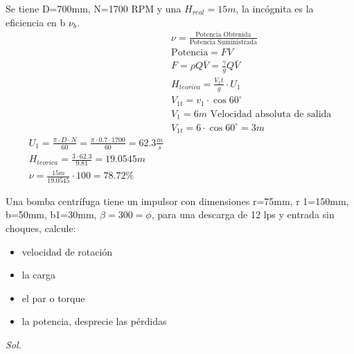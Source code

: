 Se tiene D=700mm, N=1700 RPM y una $H_{real}=15m$, la incógnita es la eficiencia en b $\nu_b$.
\begin{align*}
    &\nu = \frac{\text{Potencia Obtenida}}{\text{Potencia Suministrada}}\\
    &\text{Potencia}=FV\\
    &F =\rho Q\bar{V} = \frac{\gamma}{g}Q\bar{V}\\
    &H_{teorica} = \frac{V_1t}{g}  \cdot U_1\\
    &V_{1t} = v_1 \cdot \cos{60^{\circ}}\\
    &V_1 = 6m\text{ Velocidad absoluta de salida}\\
    &V_{1t} = 6 \cdot \cos{60^{\circ}} = 3m\\
    U_1 = \frac{\pi \cdot D \cdot N}{60} = \frac{\pi \cdot 0.7 \cdot  1700 }{60} = 62.3 \frac{m}{s}\\
    H_{teorica} = \frac{3 \cdot 62.3}{9.81} = 19.0545m\\
    \nu = \frac{15m}{19.0545} \cdot 100 = 78.72 \%\quad
\end{align*} 
\begin{example}
    Una bomba centrífuga tiene un impulsor con dimensiones r=75mm, r 1=150mm, b=50mm, b1=30mm, $\beta=300=\phi$, para una descarga de 12 lps y entrada sin choques, calcule:
    \begin{itemize}
        \item velocidad de rotación
        \item la carga
        \item el par o torque
        \item  la potencia, desprecie las pérdidas
    \end{itemize}
\textit{ Sol. }
\end{example}

